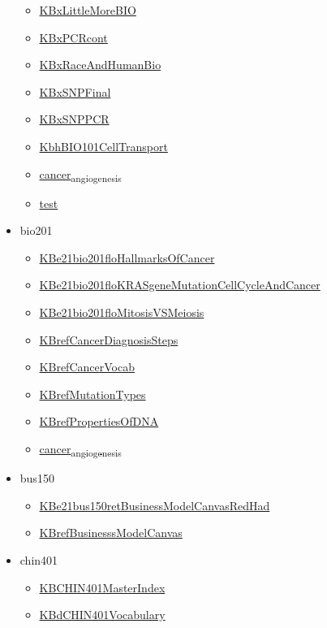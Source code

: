 \documentclass[11pt]{article}
\begin{document}
\begin{itemize}
\begin{itemize}
\item \href{bio101/KBxLittleMoreBIO.org}{KBxLittleMoreBIO}
\item \href{bio101/KBxPCRcont.org}{KBxPCRcont}
\item \href{bio101/KBxRaceAndHumanBio.org}{KBxRaceAndHumanBio}
\item \href{bio101/KBxSNPFinal.org}{KBxSNPFinal}
\item \href{bio101/KBxSNPPCR.org}{KBxSNPPCR}
\item \href{bio101/KbhBIO101CellTransport.org}{KbhBIO101CellTransport}
\item \href{bio101/cancer\_angiogenesis.org}{cancer\textsubscript{angiogenesis}}
\item \href{bio101/test.org}{test}
\end{itemize}
\item bio201
\begin{itemize}
\item \href{bio201/KBe21bio201floHallmarksOfCancer.org}{KBe21bio201floHallmarksOfCancer}
\item \href{bio201/KBe21bio201floKRASgeneMutationCellCycleAndCancer.org}{KBe21bio201floKRASgeneMutationCellCycleAndCancer}
\item \href{bio201/KBe21bio201floMitosisVSMeiosis.org}{KBe21bio201floMitosisVSMeiosis}
\item \href{bio201/KBrefCancerDiagnosisSteps.org}{KBrefCancerDiagnosisSteps}
\item \href{bio201/KBrefCancerVocab.org}{KBrefCancerVocab}
\item \href{bio201/KBrefMutationTypes.org}{KBrefMutationTypes}
\item \href{bio201/KBrefPropertiesOfDNA.org}{KBrefPropertiesOfDNA}
\item \href{bio201/cancer\_angiogenesis.org}{cancer\textsubscript{angiogenesis}}
\end{itemize}
\item bus150
\begin{itemize}
\item \href{bus150/KBe21bus150retBusinessModelCanvasRedHad.org}{KBe21bus150retBusinessModelCanvasRedHad}
\item \href{bus150/KBrefBusinesssModelCanvas.org}{KBrefBusinesssModelCanvas}
\end{itemize}
\item chin401
\begin{itemize}
\item \href{chin401/KBCHIN401MasterIndex.org}{KBCHIN401MasterIndex}
\item \href{chin401/KBdCHIN401Vocabulary.org}{KBdCHIN401Vocabulary}

\end{itemize}
\end{itemize}
\end{document}

